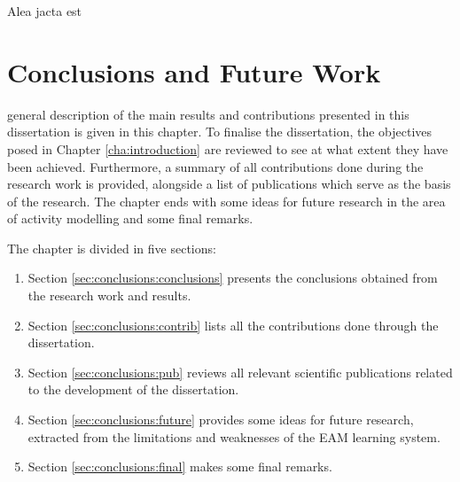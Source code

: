 

\begin{savequote}[50mm]
Alea jacta est
\end{savequote}


\chapter{Conclusions and Future Work}
\label{cha:conclusions}

\ifpdf
    \graphicspath{{7_conclusions/figures/PDF/}{7_conclusions/figures/PNG/}{7_conclusions/figures/}}
\else
    \graphicspath{{7_conclusions/figures/EPS/}{7_conclusions/figures/}}
\fi

 general description of the main results and contributions presented in this dissertation is given in this chapter. To finalise the dissertation, the objectives posed in Chapter \ref{cha:introduction} are reviewed to see at what extent they have been achieved. Furthermore, a summary of all contributions done during the research work is provided, alongside a list of publications which serve as the basis of the research. The chapter ends with some ideas for future research in the area of activity modelling and some final remarks.

The chapter is divided in five sections:

\begin{enumerate}
 \item Section \ref{sec:conclusions:conclusions} presents the conclusions obtained from the research work and results.
 \item Section \ref{sec:conclusions:contrib} lists all the contributions done through the dissertation.
 \item Section \ref{sec:conclusions:pub} reviews all relevant scientific publications related to the development of the dissertation.
 \item Section \ref{sec:conclusions:future} provides some ideas for future research, extracted from the limitations and weaknesses of the EAM learning system.
 \item Section \ref{sec:conclusions:final} makes some final remarks.
\end{enumerate}

